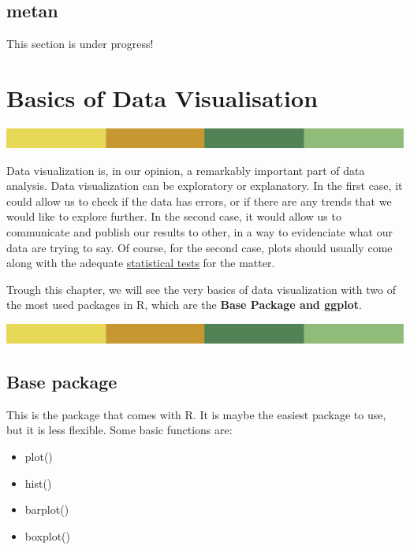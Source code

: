 \documentclass[
]{book}
\providecommand{\tightlist}{%
  \setlength{\itemsep}{0pt}\setlength{\parskip}{0pt}}
\begin{document}
\hypertarget{metan}{%
\section{metan}\label{metan}}

This section is under progress!

\hypertarget{basics-of-data-visualisation}{%
\chapter{Basics of Data Visualisation}\label{basics-of-data-visualisation}}

\includegraphics{rsrstrip.png}

Data visualization is, in our opinion, a remarkably important part of data analysis. Data visualization can be exploratory or explanatory. In the first case, it could allow us to check if the data has errors, or if there are any trends that we would like to explore further. In the second case, it would allow us to communicate and publish our results to other, in a way to evidenciate what our data are trying to say. Of course, for the second case, plots should usually come along with the adequate \protect\hyperlink{statistical-tests}{statistical tests} for the matter.

Trough this chapter, we will see the very basics of data visualization with two of the most used packages in R, which are the \textbf{Base Package and ggplot}.

\includegraphics{rsrstrip.png}

\hypertarget{base-package}{%
\section{Base package}\label{base-package}}

This is the package that comes with R. It is maybe the easiest package to use, but it is less flexible. Some basic functions are:

\begin{itemize}
\tightlist
\item
  plot()
\item
  hist()
\item
  barplot()
\item
  boxplot()
\end{itemize}
\end{document}
